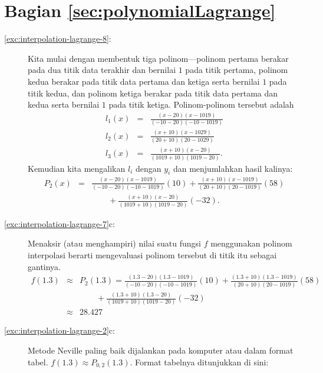 \section*{Bagian \ref{sec:polynomialLagrange}}
\begin{description}
\item [{\ref{exc:interpolation-lagrange-8}:}] Kita mulai dengan membentuk
tiga polinom---polinom pertama berakar pada dua titik data terakhir
dan bernilai $1$ pada titik pertama, polinom kedua berakar pada titik
data pertama dan ketiga serta bernilai $1$ pada titik kedua, dan
polinom ketiga berakar pada titik data pertama dan kedua serta bernilai
$1$ pada titik ketiga. Polinom-polinom tersebut adalah
\begin{eqnarray*}
l_{1}(x) & = & \frac{(x-20)(x-1019)}{(-10-20)(-10-1019)}\\
l_{2}(x) & = & \frac{(x+10)(x-1029)}{(20+10)(20-1029)}\\
l_{3}(x) & = & \frac{(x+10)(x-20)}{(1019+10)(1019-20)}.
\end{eqnarray*}
Kemudian kita mengalikan $l_{i}$ dengan $y_{i}$ dan menjumlahkan
hasil kalinya:
\begin{eqnarray*}
P_{2}(x) & = & \frac{(x-20)(x-1019)}{(-10-20)(-10-1019)}(10)+\frac{(x+10)(x-1019)}{(20+10)(20-1019)}(58)\\
 &  & \qquad+\frac{(x+10)(x-20)}{(1019+10)(1019-20)}(-32).
\end{eqnarray*}
\item [{\ref{exc:interpolation-lagrange-7}c:}] Menaksir (atau menghampiri)
nilai suatu fungsi $f$ menggunakan polinom interpolasi berarti mengevaluasi
polinom tersebut di titik itu sebagai gantinya. 
\begin{eqnarray*}
f(1.3) & \approx & P_{2}(1.3)=\frac{(1.3-20)(1.3-1019)}{(-10-20)(-10-1019)}(10)+\frac{(1.3+10)(1.3-1019)}{(20+10)(20-1019)}(58)\\
 &  & \qquad+\frac{(1.3+10)(1.3-20)}{(1019+10)(1019-20)}(-32)\\
 & \approx & 28.427
\end{eqnarray*}
\item [{\ref{exc:interpolation-lagrange-2}c:}] Metode Neville paling baik
dijalankan pada komputer atau dalam format tabel. $f(1.3)\approx P_{0,2}(1.3)$.
Format tabelnya ditunjukkan di sini:


\end{description}

